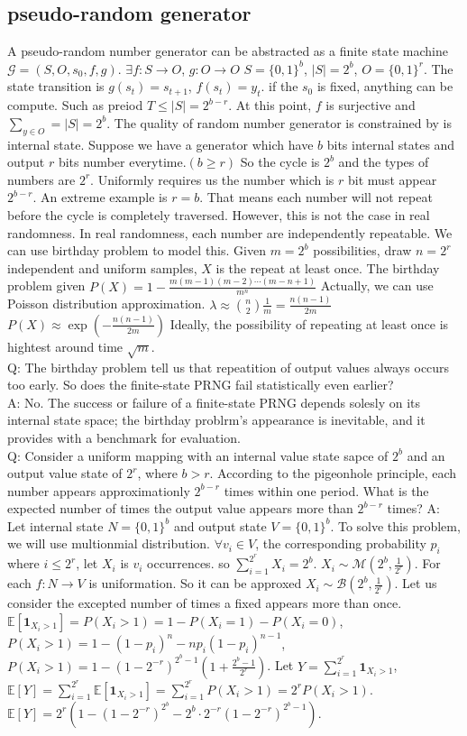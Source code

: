 \documentclass[10pt,a4paper]{article}
\begin{document}
\subsection{pseudo-random generator}
A pseudo-random number generator can be abstracted as a finite state machine $\mathcal{G}=(S,O,s_0,f,g)$.
$\exists f:S\to O$, $g:O\to O$ $S=\{0,1\}^b$, $|S|=2^b$, $O=\{0,1\}^r$. The state transition is $g(s_t)=s_{t+1}$, $f(s_t)=y_t$. if the $s_0$ is fixed, anything can be compute. Such as preiod $T\le|S|=2^{b-r}$. 
At this point, $f$ is surjective and $\sum\limits_{y\in O}=|S|=2^b$.
The quality of random number generator is constrained by is internal state. Suppose we have a generator which 
have $b$ bits internal states and output $r$ bits number everytime.$(b\ge r)$ So the cycle is $2^b$ and the types of numbers are $2^r$.
Uniformly requires us the number which is $r$ bit must appear $2^{b-r}$. An extreme example is $r=b$.
That means each number will not repeat before the cycle is completely traversed. However, this is not the case in real randomness.
In real randomness, each number are independently repeatable. We can use birthday problem to model this.
Given $m=2^b$ possibilities, draw $n=2^r$ independent and uniform samples, $X$ is the repeat at least once. The birthday problem given $P(X)=1-\frac{m(m-1)(m-2)\cdots(m-n+1)}{m^n}$
Actually, we can use Poisson distribution approximation.
$\lambda\approx\binom{n}{2}\frac{1}{m}=\frac{n(n-1)}{2m}$
$P(X)\approx\exp(-\frac{n(n-1)}{2m})$
Ideally, the possibility of repeating at least once is hightest around time $\sqrt{m}$.\\
Q: The birthday problem tell us that repeatition of output values always occurs too early.
So does the finite-state PRNG fail statistically even earlier?\\
A: No. The success or failure of a finite-state PRNG depends solesly on its internal state space; the birthday problrm's appearance is inevitable, and it provides with a benchmark for evaluation.\\
Q: Consider a uniform mapping with an internal value state sapce of $2^b$ and an output value state of $2^r$, where $b>r$.
According to the pigeonhole principle, each number appears approximationly $2^{b-r}$ times within one period. 
What is the expected number of times the output value appears more than $2^{b-r}$ times?
A: Let internal state $N=\{0,1\}^b$ and output state $V=\{0,1\}^b$. To solve this problem, we will use multionmial distribution. 
$\forall v_i\in V$, the corresponding probability $p_i$ where $i\le 2^r$, let $X_i$ is $v_i$ occurrences. so $\sum\limits_{i=1}^{2^r}X_i=2^b$. $X_i\sim\mathcal{M}(2^b,\frac{1}{2^r})$. For each $f:N\to V$ is uniformation. So it can be approxed $X_i\sim\mathcal{B}(2^b,\frac{1}{2^r})$. Let us consider the excepted number of times a fixed appears more than once. $\mathbb{E}[\mathbf{1}_{X_i>1}]=P(X_i>1)=1-P(X_i=1)-P(X_i=0)$, $P(X_i>1)=1-(1-p_i)^n-np_i(1-p_i)^{n-1}$,$P(X_i>1)=1-(1-2^{-r})^{2^b-1}(1+\frac{2^b-1}{2^r})$. Let $Y=\sum\limits_{i=1}^{2^r}\mathbf{1}_{X_i>1}$, $\mathbb{E}[Y]=\sum\limits_{i=1}^{2^r}\mathbb{E}[\mathbf{1}_{X_i>1}]=\sum\limits_{i=1}^{2^r}P(X_i>1)=2^rP(X_i>1)$. 
$\mathbb{E}[Y]=2^r\left(1-(1-2^{-r})^{2^b}-2^b\cdot2^{-r}(1-2^{-r})^{2^b-1}\right)$.
\end{document}
